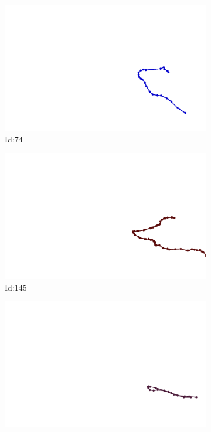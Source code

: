 \documentclass[12pt,twoside]{report}
\begin{document}
\begin{figure}
\centering
\begin{subfigure}[b]{0.20\textwidth}
\centering
\includegraphics[width=\textwidth]{../../trajectories/74.png}
\caption{Id:74}
\end{subfigure}
\begin{subfigure}[b]{0.20\textwidth}
\centering
\includegraphics[width=\textwidth]{../../trajectories/145.png}
\caption{Id:145}
\end{subfigure}
\begin{subfigure}[b]{0.20\textwidth}
\centering
\includegraphics[width=\textwidth]{../../trajectories/309.png}

\end{subfigure}
\end{figure}
\end{document}
